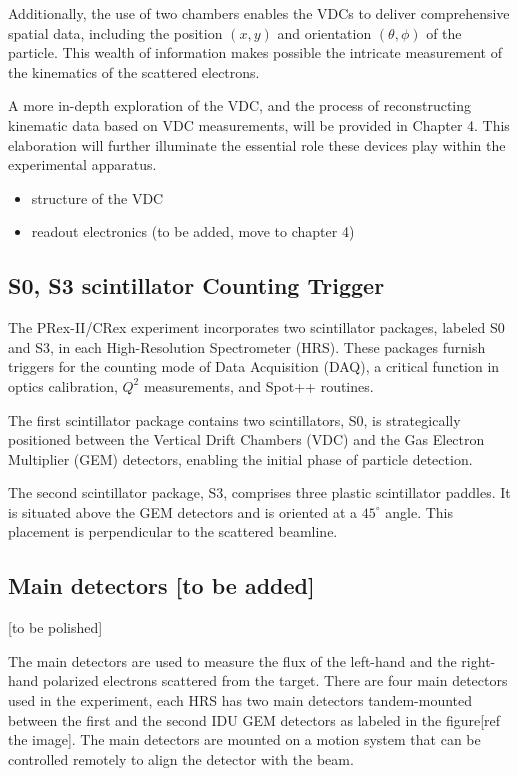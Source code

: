 Additionally, the use of two chambers enables the VDCs to deliver comprehensive spatial data, including the position $(x,y)$ and orientation $(\theta, \phi)$ of the particle. This wealth of information makes possible the intricate measurement of the kinematics of the scattered electrons.

A more in-depth exploration of the VDC, and the process of reconstructing kinematic data based on VDC measurements, will be provided in Chapter 4. This elaboration will further illuminate the essential role these devices play within the experimental apparatus.

\begin{itemize}
    \item structure of the VDC 
    \item readout electronics (to be added, move to chapter 4)
\end{itemize}

\subsection{S0, S3 scintillator Counting Trigger}

The PRex-II/CRex experiment incorporates two scintillator packages, labeled S0 and S3, in each High-Resolution Spectrometer (HRS). These packages furnish triggers for the counting mode of Data Acquisition (DAQ), a critical function in optics calibration, $Q^2$ measurements, and Spot++ routines.

The first scintillator package contains two scintillators, S0, is strategically positioned between the Vertical Drift Chambers (VDC) and the Gas Electron Multiplier (GEM) detectors, enabling the initial phase of particle detection.

The second scintillator package, S3, comprises three plastic scintillator paddles. It is situated above the GEM detectors and is oriented at a $45^\circ$ angle. This placement is perpendicular to the scattered beamline. 


\subsection{Main detectors [to be added]}
 [to be polished]
 
The main detectors are used to measure the flux of the left-hand and the right-hand polarized electrons scattered from the target. There are four main detectors used in the experiment, each HRS has two main detectors tandem-mounted between the first and the second IDU GEM detectors as labeled in the figure[ref the image]. The main detectors are mounted on a motion system that can be controlled remotely to align the detector with the beam. 


